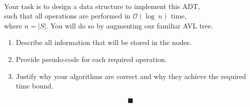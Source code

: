 \documentclass{article}
\begin{document}
\paragraph{}
Your task is to design a data structure to implement this ADT, \\
such that all operations are performed in $\mathcal{O} (\log\ n)$ time, \\
where $n = |S|$. You will do so by augmenting our familiar AVL tree.

\begin{enumerate}
    \item Describe all information that will be stored in the nodes.
    \item Provide pseudo-code for each required operation.
    \item Justify why your algorithms are correct and why they achieve the required time bound.
\end{enumerate}

\newpage
\mbox{}
\vfill{$$\blacksquare$$}
\end{document}
